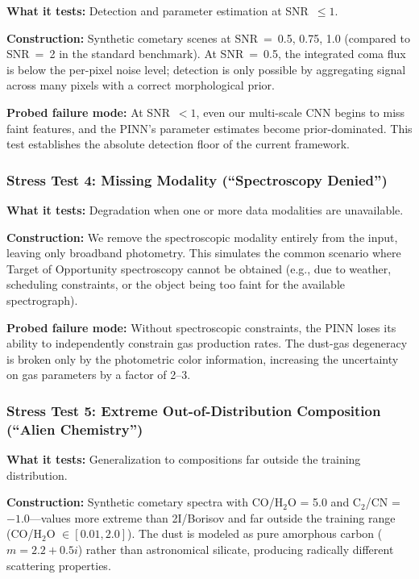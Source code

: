 \documentclass[preprint2]{aastex631}
\begin{document}
\textbf{What it tests:} Detection and parameter estimation at SNR~$\leq 1$.

\textbf{Construction:} Synthetic cometary scenes at SNR~=~0.5, 0.75, 1.0 (compared to SNR~=~2 in the standard benchmark). At SNR~=~0.5, the integrated coma flux is below the per-pixel noise level; detection is only possible by aggregating signal across many pixels with a correct morphological prior.

\textbf{Probed failure mode:} At SNR~$<1$, even our multi-scale CNN begins to miss faint features, and the PINN's parameter estimates become prior-dominated. This test establishes the absolute detection floor of the current framework.

\subsubsection{Stress Test 4: Missing Modality (``Spectroscopy Denied'')}

\textbf{What it tests:} Degradation when one or more data modalities are unavailable.

\textbf{Construction:} We remove the spectroscopic modality entirely from the input, leaving only broadband photometry. This simulates the common scenario where Target of Opportunity spectroscopy cannot be obtained (e.g., due to weather, scheduling constraints, or the object being too faint for the available spectrograph).

\textbf{Probed failure mode:} Without spectroscopic constraints, the PINN loses its ability to independently constrain gas production rates. The dust-gas degeneracy is broken only by the photometric color information, increasing the uncertainty on gas parameters by a factor of 2--3.

\subsubsection{Stress Test 5: Extreme Out-of-Distribution Composition (``Alien Chemistry'')}

\textbf{What it tests:} Generalization to compositions far outside the training distribution.

\textbf{Construction:} Synthetic cometary spectra with CO/H$_2$O = 5.0 and C$_2$/CN = $-1.0$---values more extreme than 2I/Borisov and far outside the training range (CO/H$_2$O $\in [0.01, 2.0]$). The dust is modeled as pure amorphous carbon ($m = 2.2 + 0.5i$) rather than astronomical silicate, producing radically different scattering properties.
\end{document}
